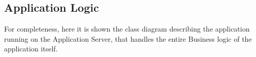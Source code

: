 \documentclass[../../../DD.tex]{subfiles}
\begin{document}
	
	\subsection{Application Logic\label{subsect:2.6.5}}
	
	For completeness, here it is shown the class diagram describing the application running on the Application Server, that handles the entire Business logic of the application itself.
	
	
	\newpage
\end{document}
